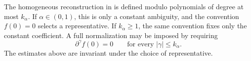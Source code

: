 {}
{}

\begin{remark}
  \label{rmk:homogeneous-reconstruction-representative}
  The homogeneous reconstruction in  is
  defined modulo polynomials of degree at most \(k_{\alpha}\). If
  \(\alpha \in (0, 1)\), this is only a constant ambiguity, and the convention
  \(f(0) = 0\) selects a representative. If \(k_{\alpha} \ge 1\), the same
  convention fixes only the constant coefficient. A full normalization may be
  imposed by requiring
  \[
    \partial^{\gamma} f(0) = 0
    \qquad
    \text{for every } |\gamma| \le k_{\alpha}.
  \]
  The estimates above are invariant under the choice of representative.
\end{remark}

